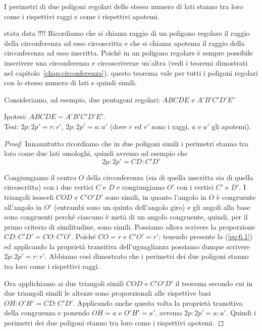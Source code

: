 \begin{teorema}
I perimetri di due poligoni regolari dello stesso numero di lati 
stanno tra loro come i rispettivi raggi e come i rispettivi apotemi.
\end{teorema}

stata data !!!!
Ricordiamo che si chiama raggio di un poligono regolare il raggio 
della circonferenza ad esso circoscritta e che si chiama apotema il 
raggio della circonferenza ad esso inscritta. Poiché in un poligono 
regolare è sempre possibile inscrivere una circonferenza e 
circoscriverne un'altra (vedi i teoremi dimostrati nel 
capitolo~\ref{chap:circonferenza}), questo teorema vale per tutti i 
poligoni regolari con lo stesso numero di lati e quindi simili.

Consideriamo, ad esempio, due pentagoni regolari: \(ABCDE\) e 
\(A'B'C'D'E'\)

\noindent Ipotesi: \(ABCDE\sim A'B'C'D'E'\).\\
Tesi: \(2p : 2p' = r : r'\), \(2p : 2p' = a : a'\) (dove \(r\) ed \(r'\) sono 
i raggi, \(a\) e \(a'\) gli apotemi).

\begin{figure*}[!htb]
	\centering
\end{figure*}

\begin{proof}
Innanzitutto ricordiamo che in due poligoni simili i perimetri stanno 
tra loro come due lati omologhi, quindi avremo ad esempio che
\begin{equation}\label{eq:6.1}
2p : 2p' = CD : C'D'
\end{equation}

Congiungiamo il centro \(O\) della circonferenza (sia di quella 
inscritta sia di quella circoscritta) con i due vertici \(C\) e \(D\) e 
congiungiamo \(O'\) con i vertici \(C'\) e \(D'\). I triangoli isosceli 
\(COD\) e \(C'O'D'\) sono simili, in quanto l'angolo in \(O\) è congruente 
all'angolo in \(O'\) (entrambi sono un quinto dell'angolo giro) e gli 
angoli alla base sono congruenti perché ciascuno è metà di un angolo 
congruente, quindi, per il primo criterio di similitudine, sono 
simili. Possiamo allora scrivere la proporzione \(CD : C'D' = CO : 
C'O'\).
Poiché \(CO = r\) e \(C'O' = r'\); tenendo presente la (\ref{eq:6.1}) ed 
applicando la proprietà transitiva dell'uguaglianza possiamo dunque 
scrivere \(2p : 2p' = r : r'\). Abbiamo così dimostrato che i perimetri 
dei due poligoni stanno tra loro come i rispettivi raggi.

Ora applichiamo ai due triangoli simili \(COD\) e \(C'O'D'\) il teorema 
secondo cui in due triangoli simili le altezze sono proporzionali 
alle rispettive basi \(OH : O'H' = CD : C'D'\). Applicando anche questa 
volta la proprietà transitiva della congruenza e ponendo \(OH = a\) e 
\(O'H' =a'\), avremo \(2p : 2p' = a : a'\).
Quindi i perimetri dei due poligoni stanno tra loro come i rispettivi 
apotemi.
\end{proof}

